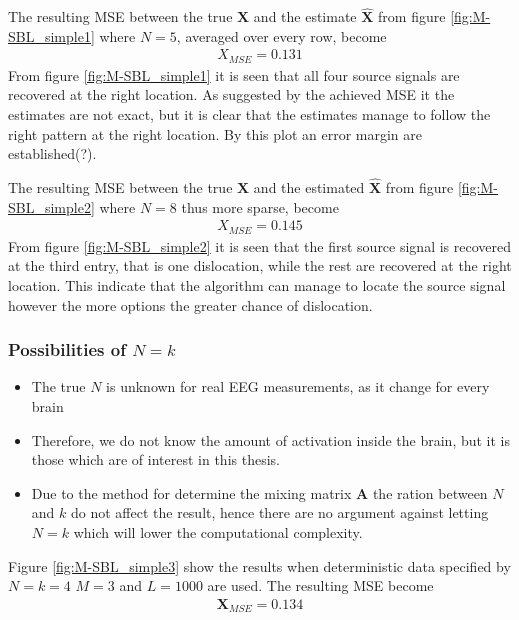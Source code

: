 The resulting MSE between the true $\textbf{X}$ and the estimate $\hat{\textbf{X}}$ from figure \ref{fig:M-SBL_simple1} where $N = 5$, averaged over every row, become 
\begin{align*}
X_{MSE} = 0.131 
\end{align*}
From figure \ref{fig:M-SBL_simple1} it is seen that all four source signals are recovered at the right location. As suggested by the achieved MSE it the estimates are not exact, but it is clear that the estimates manage to follow the right pattern at the right location. By this plot an error margin are established(?).  

The resulting MSE between the true $\textbf{X}$ and the estimated $\hat{\textbf{X}}$ from figure \ref{fig:M-SBL_simple2} where $N = 8$ thus more sparse, become 
\begin{align*}
X_{MSE} = 0.145 
\end{align*}
From figure \ref{fig:M-SBL_simple2} it is seen that the first source signal is recovered at the third entry, that is one dislocation, while the rest are recovered at the right location. This indicate that the algorithm can manage to locate the source signal however the more options the greater chance of dislocation.     

\subsubsection*{Possibilities of $N=k$}
\begin{itemize}
	\item The true $N$ is unknown for real EEG measurements, as it change for every brain
	\item Therefore, we do not know the amount of activation inside the brain, but it is those which are of interest in this thesis.
	\item Due to the method for determine the mixing matrix $\textbf{A}$ the ration between $N$ and $k$ do not affect the result, hence there are no argument against letting $N=k$ which will lower the computational complexity.    
\end{itemize}

Figure \ref{fig:M-SBL_simple3} show the results when deterministic data specified by $N=k=4$ $M = 3$ and $L=1000$ are used. The resulting MSE become
\begin{align*}
\textbf{X}_{MSE} = 0.134
\end{align*}

